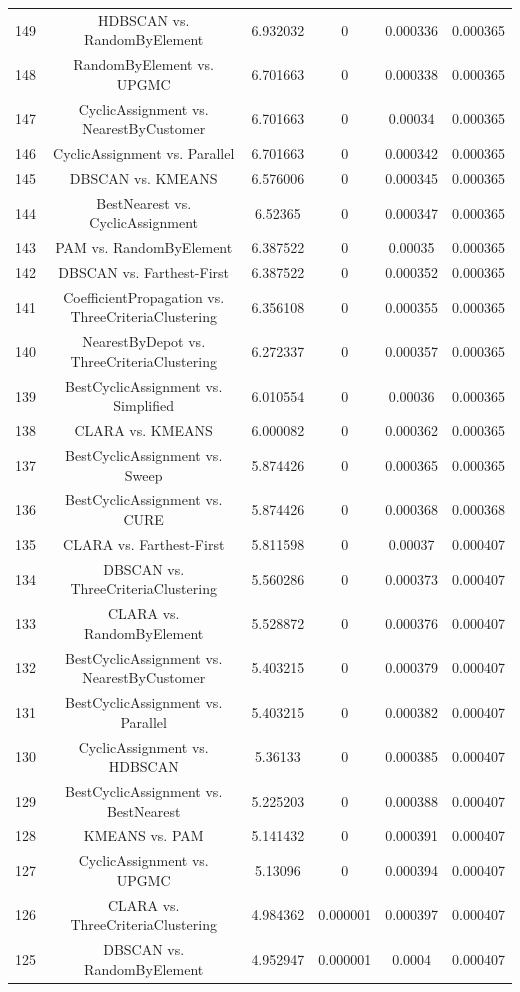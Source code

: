 \documentclass[a4paper,10pt]{article}
\begin{document}
\begin{landscape}
\begin{table}[!htp]
\begin{tabular}{cccccc}
149&HDBSCAN vs. RandomByElement&6.932032&0&0.000336&0.000365\\
148&RandomByElement vs. UPGMC&6.701663&0&0.000338&0.000365\\
147&CyclicAssignment vs. NearestByCustomer&6.701663&0&0.00034&0.000365\\
146&CyclicAssignment vs. Parallel&6.701663&0&0.000342&0.000365\\
145&DBSCAN vs. KMEANS&6.576006&0&0.000345&0.000365\\
144&BestNearest vs. CyclicAssignment&6.52365&0&0.000347&0.000365\\
143&PAM vs. RandomByElement&6.387522&0&0.00035&0.000365\\
142&DBSCAN vs. Farthest-First&6.387522&0&0.000352&0.000365\\
141&CoefficientPropagation vs. ThreeCriteriaClustering&6.356108&0&0.000355&0.000365\\
140&NearestByDepot vs. ThreeCriteriaClustering&6.272337&0&0.000357&0.000365\\
139&BestCyclicAssignment vs. Simplified&6.010554&0&0.00036&0.000365\\
138&CLARA vs. KMEANS&6.000082&0&0.000362&0.000365\\
137&BestCyclicAssignment vs. Sweep&5.874426&0&0.000365&0.000365\\
136&BestCyclicAssignment vs. CURE&5.874426&0&0.000368&0.000368\\
135&CLARA vs. Farthest-First&5.811598&0&0.00037&0.000407\\
134&DBSCAN vs. ThreeCriteriaClustering&5.560286&0&0.000373&0.000407\\
133&CLARA vs. RandomByElement&5.528872&0&0.000376&0.000407\\
132&BestCyclicAssignment vs. NearestByCustomer&5.403215&0&0.000379&0.000407\\
131&BestCyclicAssignment vs. Parallel&5.403215&0&0.000382&0.000407\\
130&CyclicAssignment vs. HDBSCAN&5.36133&0&0.000385&0.000407\\
129&BestCyclicAssignment vs. BestNearest&5.225203&0&0.000388&0.000407\\
128&KMEANS vs. PAM&5.141432&0&0.000391&0.000407\\
127&CyclicAssignment vs. UPGMC&5.13096&0&0.000394&0.000407\\
126&CLARA vs. ThreeCriteriaClustering&4.984362&0.000001&0.000397&0.000407\\
125&DBSCAN vs. RandomByElement&4.952947&0.000001&0.0004&0.000407\\

\end{tabular}
\end{table}
\end{landscape}
\end{document}
